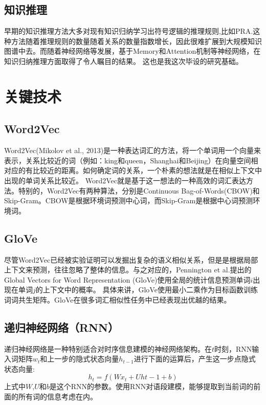 \subsection{知识推理}
早期的知识推理方法大多对现有知识归纳学习出符号逻辑的推理规则,比如PRA\cite{lao2011random}.这种方法随着推理规则的数量随着关系的数量指数增长，因此很难扩展到大规模知识图谱中去。而随着神经网络等发展，基于Memory和Attention机制等神经网络，在知识归纳推理方面取得了令人瞩目的结果。
这也是我这次毕设的研究基础。\\
\section{关键技术}
\subsection{Word2Vec}
Word2Vec(Mikolov et al., 2013\cite{mikolov2013efficient})是一种表达词汇的方法，将一个单词用一个向量来表示，关系比较近的词（例如：king和queen，Shanghai和Beijing）在向量空间相对应的有比较近的距离。如何确定词的关系，一个朴素的想法就是在相似上下文中出现的单词关系比较近。
Word2Vec就是基于这一想法的一种高效的词汇表达方法。特别的，Word2Vec有两种算法，分别是Continuous Bag-of-Words(CBOW)和Skip-Gram。CBOW是根据环境词预测中心词，而Skip-Gram是根据中心词预测环境词。\\
\subsection{GloVe}
尽管Word2Vec已经被实验证明可以发掘出复杂的语义相似关系，但是是根据局部上下文来预测，往往忽略了整体的信息。与之对应的，Pennington et al.\cite{pennington2014glove}提出的Global Vectors for Word Representation (GloVe)使用全局的统计信息预测单词$i$出现在单词$j$的上下文中的概率。
具体来讲，GloVe使用最小二乘作为目标函数训练词词共生矩阵。GloVe在很多词汇相似性任务中已经表现出优越的结果。\\
\subsection{递归神经网络（RNN）}
递归神经网络是一种特别适合对时序信息建模的神经网络架构。在$t$时刻，RNN输入词矩阵$w_t$和上一步的隐式状态向量$h_{t-1}$进行下面的运算后，产生这一步点隐式状态向量:\\
\begin{equation}
h_t = f(Wx_t+Uh{t-1}+b)
\end{equation}
上式中$W$,$U$和$b$是这个RNN的参数。使用RNN对语段建模，能够提取到当前词的前面的所有词的信息考虑在内。
